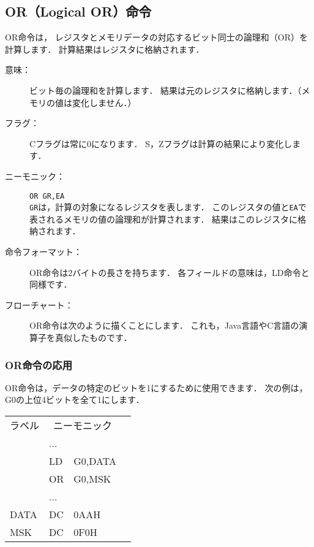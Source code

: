\newpage
\subsection{OR（Logical OR）命令}
OR命令は，
レジスタとメモリデータの対応するビット同士の論理和（OR）を計算します．
計算結果はレジスタに格納されます．

\begin{description}
\item[意味：]ビット毎の論理和を計算します．
結果は元のレジスタに格納します．（メモリの値は変化しません．）

\item[フラグ：]Cフラグは常に0になります．
S，Zフラグは計算の結果により変化します．

\item[ニーモニック：]{\tt OR  GR,EA} \\
{\tt GR}は，計算の対象になるレジスタを表します．
このレジスタの値と{\tt EA}で表されるメモリの値の論理和が計算されます．
結果はこのレジスタに格納されます．

\item[命令フォーマット：]OR命令は2バイトの長さを持ちます．
各フィールドの意味は，LD命令と同様です．


\item[フローチャート：]OR命令は次のように描くことにします．
これも，Java言語やC言語の演算子を真似したものです．

\begin{center}
\end{center}

\end{description}

\subsubsection{OR命令の応用}
OR命令は，データの特定のビットを1にするために使用できます．
次の例は，G0の上位4ビットを全て1にします．

{\tt\small\begin{center}
\begin{tabular}{|l|l l|l}
\cline{1-3}
ラベル & \multicolumn{2}{|c|}{ニーモニック} & \\
\cline{1-3}
    & ...  &        & \\
    & LD   & G0,DATA& \\
    & OR   & G0,MSK & \\
    & ...  &        & \\
DATA& DC   & 0AAH    & \\
MSK & DC   & 0F0H    & \\
\cline{1-3}
\end{tabular}
\end{center}}

